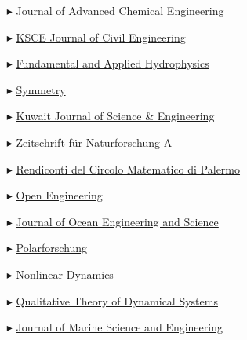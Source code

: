 \begin{itemize}
    \item[$\blacktriangleright$] \href{http://www.ashdin.com/journals/jace/jace.aspx}{Journal of Advanced Chemical Engineering}
    
    \item[$\blacktriangleright$] \href{http://www.springer.com/engineering/civil+engineering/journal/12205}{KSCE Journal of Civil Engineering}
    
    \item[$\blacktriangleright$] \href{http://hydrophysics.info/?lang=en}{Fundamental and Applied Hydrophysics}
    
    \item[$\blacktriangleright$] \href{http://www.mdpi.com/journal/symmetry}{Symmetry}
    
    \item[$\blacktriangleright$] \href{http://pubcouncil.kuniv.edu.kw/kjs/}{Kuwait Journal of Science \& Engineering}
    
    \item[$\blacktriangleright$] \href{http://www.degruyter.com/view/j/zna}{Zeitschrift f\"ur Naturforschung A}
    
    \item[$\blacktriangleright$] \href{http://www.springer.com/mathematics/journal/12215}{Rendiconti del Circolo Matematico di Palermo }
    
    \item[$\blacktriangleright$] \href{https://www.degruyter.com/view/j/eng}{Open Engineering}

    \item[$\blacktriangleright$] \href{https://www.sciencedirect.com/journal/journal-of-ocean-engineering-and-science/}{Journal of Ocean Engineering and Science}
    
    \item[$\blacktriangleright$] \href{http://www.polarforschung.de/}{Polarforschung}
    
    \item[$\blacktriangleright$] \href{https://link.springer.com/journal/11071}{Nonlinear Dynamics}

    \item[$\blacktriangleright$] \href{https://link.springer.com/journal/12346}{Qualitative Theory of Dynamical Systems}

    \item[$\blacktriangleright$] \href{https://www.mdpi.com/journal/jmse/}{Journal of Marine Science and Engineering}


\end{itemize}

